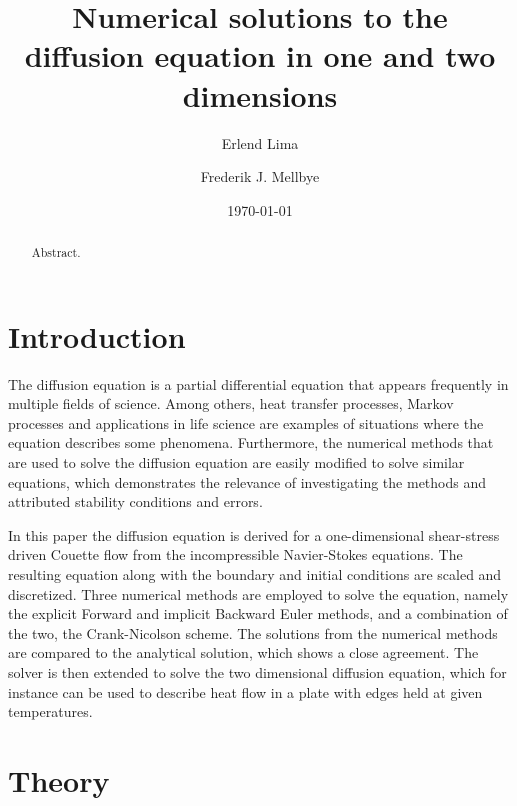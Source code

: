 \documentclass[aps,reprint]{revtex4-1}
\begin{document}
\title{Numerical solutions to the diffusion equation in one and two dimensions}
\author{Erlend Lima}
\author{Frederik J. Mellbye}
\date{\today}

\begin{abstract}
Abstract.
\end{abstract}
\maketitle
\tableofcontents
\makeatletter
\let\toc@pre\relax
\let\toc@post\relax
\makeatother

\newpage

\section{Introduction} \label{sec:introduction}
The diffusion equation is a partial differential equation that appears frequently in
multiple fields of science. Among others, heat transfer processes, Markov processes
and applications in life science are examples of situations where the equation describes
some phenomena. Furthermore, the numerical methods that are used to solve the diffusion
equation are easily modified to solve similar equations, which demonstrates the relevance
of investigating the methods and attributed stability conditions and errors.

In this paper the diffusion equation is derived for a one-dimensional shear-stress
driven Couette flow from the incompressible Navier-Stokes equations. The resulting
equation along with the boundary and initial conditions are scaled and discretized.
Three numerical methods are employed to solve the equation, namely the explicit Forward and
implicit Backward Euler methods, and a combination of the two, the Crank-Nicolson scheme.
The solutions from the numerical methods are compared to the analytical solution, which
shows a close agreement. The solver is then extended to solve the two dimensional
diffusion equation, which for instance can be used to describe heat flow in a
plate with edges held at given temperatures.
\section{Theory} \label{sec:theory}
\end{document}
